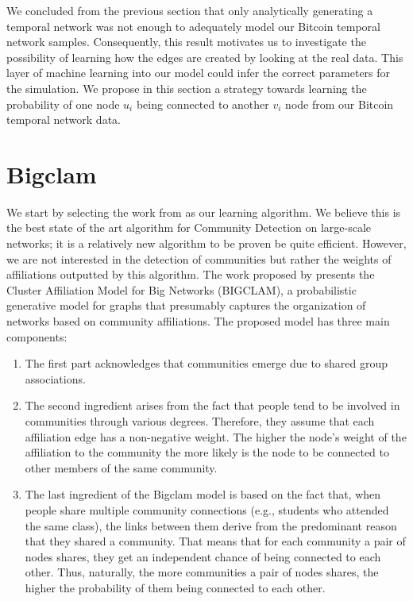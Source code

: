 \documentclass[../../thesis.tex]{subfiles}
\begin{document}
We concluded from the previous section that only analytically generating a temporal network was not enough to adequately model our Bitcoin temporal network samples.  Consequently, this result motivates us to investigate the possibility of learning how the edges are created by looking at the real data. This layer of machine learning into our model could infer the correct parameters for the simulation. We propose in this section a strategy towards learning the probability of one node $u_{i}$ being connected to another $v_{i}$ node from our Bitcoin temporal network data. 

\section{Bigclam}
\label{sec:biglcam}

We start by selecting the work from \citeauthor{yang2013overlapping}  \cite{yang2013overlapping} as our learning algorithm. We believe this is the best state of the art algorithm for Community Detection on large-scale networks; it is a relatively new algorithm to be proven be quite efficient. However, we are not interested in the detection of communities but rather the weights of affiliations outputted by this algorithm. The work proposed by \citeauthor{yang2013overlapping}\cite{yang2013overlapping} presents the Cluster Affiliation Model for Big Networks (BIGCLAM), a probabilistic generative model for graphs that presumably captures the organization of networks based on community affiliations. The proposed model has three main components:
\begin{enumerate}

  \item{The first part acknowledges that communities emerge due to shared group associations.}
  
  \item{The second ingredient arises from the fact that people tend to be
involved in communities through various degrees. Therefore, they assume that each affiliation edge has a non-negative weight. The higher the node’s weight of the affiliation to the community the more likely is the node to be connected to other members of the same community.}

  \item{The last ingredient of the Bigclam model is based on the fact that, when people share multiple community connections (e.g., students who attended the same class), the links between them derive from the predominant reason that they shared a community. That means that for each community a pair of nodes shares, they get an independent chance of being connected to each other. Thus, naturally, the more communities a pair of nodes shares, the higher the probability of them being connected to each other.}
  
\end{enumerate}
\end{document}
